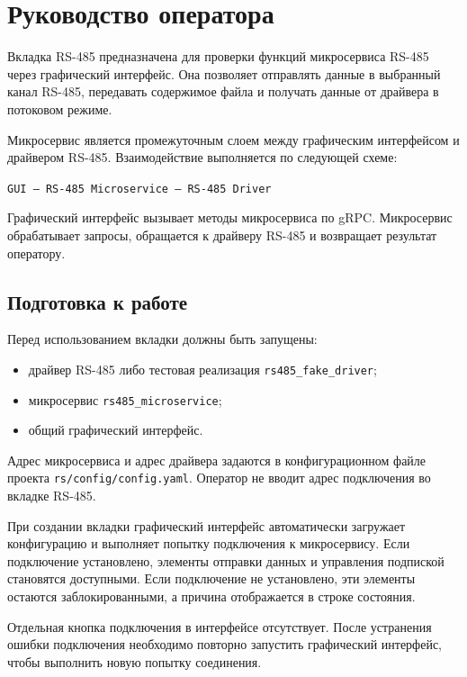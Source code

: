 \chapter{Руководство оператора}

Вкладка RS-485 предназначена для проверки функций микросервиса RS-485 через
графический интерфейс. Она позволяет отправлять данные в выбранный канал
RS-485, передавать содержимое файла и получать данные от драйвера в потоковом
режиме.

Микросервис является промежуточным слоем между графическим интерфейсом и
драйвером RS-485. Взаимодействие выполняется по следующей схеме:

\begin{center}
	\texttt{GUI --- RS-485 Microservice --- RS-485 Driver}
\end{center}

Графический интерфейс вызывает методы микросервиса по gRPC. Микросервис
обрабатывает запросы, обращается к драйверу RS-485 и возвращает результат
оператору.

\section{Подготовка к работе}

Перед использованием вкладки должны быть запущены:

\begin{itemize}
	\item драйвер RS-485 либо тестовая реализация \texttt{rs485\_fake\_driver};
	\item микросервис \texttt{rs485\_microservice};
	\item общий графический интерфейс.
\end{itemize}

Адрес микросервиса и адрес драйвера задаются в конфигурационном файле проекта
\texttt{rs/config/config.yaml}. Оператор не вводит адрес подключения во
вкладке RS-485.

При создании вкладки графический интерфейс автоматически загружает
конфигурацию и выполняет попытку подключения к микросервису. Если подключение
установлено, элементы отправки данных и управления подпиской становятся
доступными. Если подключение не установлено, эти элементы остаются
заблокированными, а причина отображается в строке состояния.

Отдельная кнопка подключения в интерфейсе отсутствует. После устранения
ошибки подключения необходимо повторно запустить графический интерфейс, чтобы
выполнить новую попытку соединения.

